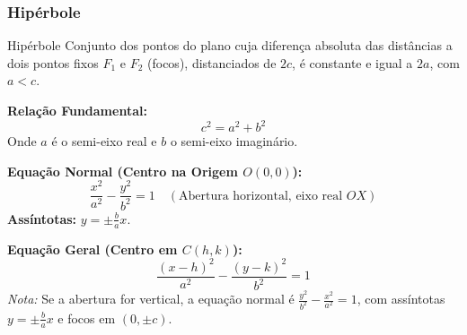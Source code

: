 \documentclass[11pt,a4paper]{article}
\begin{document}
\subsubsection{Hipérbole}
\begin{minipage}{0.58\textwidth}
  \begin{definitionbox}{Hipérbole}
    Conjunto dos pontos do plano cuja diferença absoluta das distâncias a dois pontos fixos $F_1$ e $F_2$ (focos), distanciados de $2c$, é constante e igual a $2a$, com $a < c$.
    
    \textbf{Relação Fundamental:}
    \begin{equation*}
      c^2 = a^2 + b^2
    \end{equation*}
    Onde $a$ é o semi-eixo real e $b$ o semi-eixo imaginário.
    
    \textbf{Equação Normal (Centro na Origem $O(0,0)$):}
    \begin{equation*}
      \frac{x^2}{a^2} - \frac{y^2}{b^2} = 1 \quad (\text{Abertura horizontal, eixo real } OX)
    \end{equation*}
    \textbf{Assíntotas:} $y = \pm \frac{b}{a} x$.
    
    \textbf{Equação Geral (Centro em $C(h,k)$):}
    \begin{equation*}
      \frac{(x-h)^2}{a^2} - \frac{(y-k)^2}{b^2} = 1
    \end{equation*}
    \textit{Nota:} Se a abertura for vertical, a equação normal é $\frac{y^2}{b^2} - \frac{x^2}{a^2} = 1$, com assíntotas $y = \pm \frac{b}{a} x$ e focos em $(0, \pm c)$.
  \end{definitionbox}
\end{minipage}
\hfill
\end{document}
